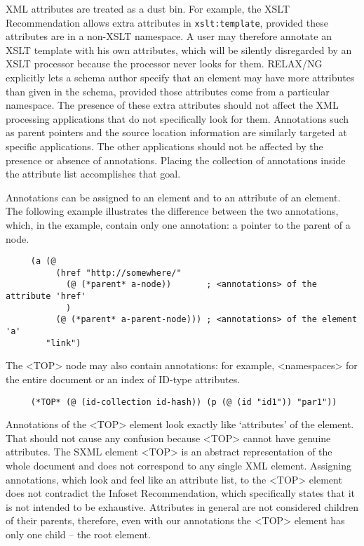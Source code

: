 \documentclass[10pt]{article}
\begin{document}
XML attributes are treated as a dust bin. For example, the XSLT
Recommendation allows extra attributes in \texttt{xslt:template}, provided these attributes are in a non-XSLT
namespace. A user may therefore annotate an XSLT template with his
own attributes, which will be silently disregarded by an XSLT
processor because the processor never looks for them. RELAX/NG
explicitly lets a schema author specify that an element may have more
attributes than given in the schema, provided those attributes come
from a particular namespace. The presence of these extra attributes
should not affect the XML processing applications that do not specifically
look for them. Annotations such as parent pointers and the source
location information are similarly targeted at specific
applications. The other applications should not be affected by the
presence or absence of annotations. Placing the collection of
annotations inside the attribute list accomplishes that goal.

Annotations can be assigned to an element and to an attribute
of an element. The following example illustrates the difference
between the two annotations, which, in the example, contain only one
annotation: a pointer to the parent of a node.

\begin{verbatim}
     (a (@ 
          (href "http://somewhere/" 
            (@ (*parent* a-node))       ; <annotations> of the attribute 'href'
            )
          (@ (*parent* a-parent-node))) ; <annotations> of the element 'a'
        "link")
\end{verbatim}
The <TOP> node may also contain annotations: for
example, <namespaces> for the entire document or an
index of ID-type attributes.

\begin{verbatim}
     (*TOP* (@ (id-collection id-hash)) (p (@ (id "id1")) "par1"))
\end{verbatim}
Annotations of the <TOP> element look exactly
like `attributes' of the element. That should not cause any confusion
because <TOP> cannot have genuine attributes. The SXML
element <TOP> is an abstract representation of the whole
document and does not correspond to any single XML element. Assigning
annotations, which look and feel like an attribute list, to the
<TOP> element does not contradict the Infoset
Recommendation, which specifically states that it is not intended to
be exhaustive. Attributes in general are not considered children of
their parents, therefore, even with our annotations the <TOP> element has only one child -- the root element.
\end{document}
